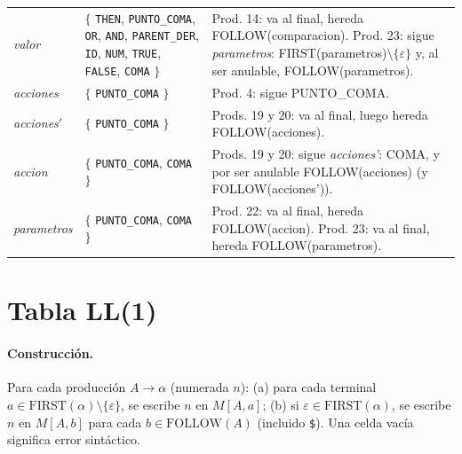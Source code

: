 \begin{longtable}{@{}>{\raggedright\arraybackslash}p{2.6cm} >{\raggedright\arraybackslash}p{5.3cm} >{\raggedright\arraybackslash}p{6.9cm}@{}}
\textit{valor} & $\{$ \texttt{THEN}, \texttt{PUNTO\_COMA}, \texttt{OR}, \texttt{AND}, \texttt{PARENT\_DER}, \texttt{ID}, \texttt{NUM}, \texttt{TRUE}, \texttt{FALSE}, \texttt{COMA} $\}$ & \footnotesize Prod. 14: va al final, hereda FOLLOW(comparacion). Prod. 23: sigue \textit{parametros}: FIRST(parametros)$\setminus\{\varepsilon\}$ y, al ser anulable, FOLLOW(parametros). \\
\textit{acciones} & $\{$ \texttt{PUNTO\_COMA} $\}$ & \footnotesize Prod. 4: sigue PUNTO\_COMA. \\
\textit{acciones}$'$ & $\{$ \texttt{PUNTO\_COMA} $\}$ & \footnotesize Prods. 19 y 20: va al final, luego hereda FOLLOW(acciones). \\
\textit{accion} & $\{$ \texttt{PUNTO\_COMA}, \texttt{COMA} $\}$ & \footnotesize Prods. 19 y 20: sigue \textit{acciones'}: COMA, y por ser anulable FOLLOW(acciones) (y FOLLOW(acciones')). \\
\textit{parametros} & $\{$ \texttt{PUNTO\_COMA}, \texttt{COMA} $\}$ & \footnotesize Prod. 22: va al final, hereda FOLLOW(accion). Prod. 23: va al final, hereda FOLLOW(parametros). \\
\bottomrule
\end{longtable}

\section{Tabla LL(1)}

\paragraph{Construcción.} Para cada producción $A\to\alpha$ (numerada $n$): (a) para cada terminal $a\in\mathrm{FIRST}(\alpha)\setminus\{\varepsilon\}$,
se escribe $n$ en $M[A,a]$; (b) si $\varepsilon\in\mathrm{FIRST}(\alpha)$, se escribe $n$ en $M[A,b]$ para cada
$b\in\mathrm{FOLLOW}(A)$ (incluido \texttt{\$}). Una celda vacía significa error sintáctico.

